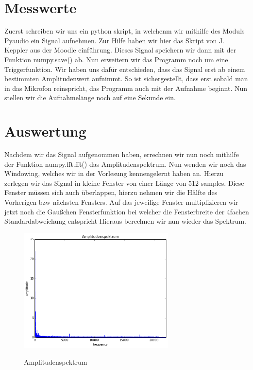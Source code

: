\documentclass[TGAI_Laborbericht.tex]{subfiles}
\begin{document}
\section{Messwerte}
\label{chap:VERSUCH_1_MESSWERTE}
Zuerst schreiben wir uns ein python skript, in welchenm wir mithilfe des Moduls Pyaudio ein Signal aufnehmen. Zur Hilfe haben wir hier das Skript von J. Keppler aus der Moodle einführung. Dieses Signal speichern wir dann mit der Funktion numpy.save() ab. Nun erweitern wir das Programm noch um eine Triggerfunktion. Wir haben uns dafür entschieden, dass das Signal erst ab einem bestimmten Amplitudenwert aufnimmt. So ist sichergestellt, dass erst sobald man in das Mikrofon reinspricht, das Programm auch mit der Aufnahme beginnt. Nun stellen wir die Aufnahmelänge noch auf eine Sekunde ein.

\section{Auswertung}
\label{chap:VERSUCH_1_AUSWERTUNG}
Nachdem wir das Signal aufgenommen haben, errechnen wir nun noch mithilfe der Funktion numpy.fft.fft() das Amplitudenspektrum. Nun wenden wir noch das Windowing, welches wir in der Vorlesung kennengelernt haben an. Hierzu zerlegen wir das Signal in kleine Fenster von einer Länge von 512 samples. Diese Fenster müssen sich auch überlappen, hierzu nehmen wir die Hälfte des Vorherigen bzw nächsten Fensters. Auf das jeweilige Fenster multiplizieren wir jetzt noch die Gaußchen Fensterfunktion bei welcher die Fensterbreite der 4fachen Standardabweichung entspricht Hieraus berechnen wir nun wieder das Spektrum.

\begin{figure}[H]
	\includegraphics[width=0.7\textwidth]{media/amplitudenspektrum.png}
	\label{Amplitudenspektrum}
	\caption{Amplitudenspektrum}
\end{figure}
\end{document}
